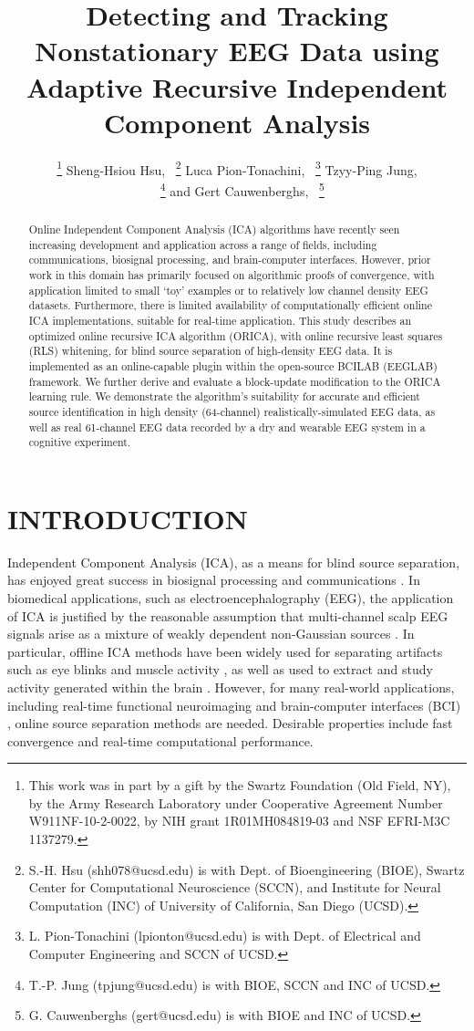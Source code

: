 \documentclass[letterpaper, 10 pt, conference]{ieeeconf}  %
\title{\LARGE \bf
Detecting and Tracking Nonstationary EEG Data using Adaptive Recursive Independent Component Analysis
}
\author{
	\thanks{This work was in part by a gift by the Swartz Foundation (Old Field, NY), by the Army Research Laboratory under Cooperative Agreement Number W911NF-10-2-0022, by NIH grant 1R01MH084819-03 and NSF EFRI-M3C 1137279.}
	Sheng-Hsiou Hsu,~\IEEEmembership{Student Member,~IEEE,}
	\thanks{S.-H. Hsu (shh078@ucsd.edu) is with Dept. of Bioengineering (BIOE), Swartz Center for Computational Neuroscience (SCCN), and Institute for Neural Computation (INC) of University of California, San Diego (UCSD).}
	Luca Pion-Tonachini,~\IEEEmembership{Student Member,~IEEE,}
	\thanks{L. Pion-Tonachini (lpionton@ucsd.edu) is with Dept. of Electrical and Computer Engineering and SCCN of UCSD.}
	Tzyy-Ping Jung,\\~\IEEEmembership{Senior Member,~IEEE,}
	\thanks{T.-P. Jung (tpjung@ucsd.edu) is with BIOE, SCCN and INC of UCSD.}
	and Gert Cauwenberghs,~\IEEEmembership{Fellow,~IEEE}
	\thanks{G. Cauwenberghs (gert@ucsd.edu) is with BIOE and INC of UCSD.}    
}
\begin{document}
\maketitle
\thispagestyle{empty}
\pagestyle{empty}




\begin{abstract}
Online Independent Component Analysis (ICA) algorithms have recently seen increasing development and application across a range of fields, including communications, biosignal processing, and brain-computer interfaces. However, prior work in this domain has primarily focused on algorithmic proofs of convergence, with application limited to small `toy' examples or to relatively low channel density EEG datasets. Furthermore, there is limited availability of computationally efficient online ICA implementations, suitable for real-time application. This study describes an optimized online recursive ICA algorithm (ORICA), with online recursive least squares (RLS) whitening, for blind source separation of high-density EEG data. It is implemented as an online-capable plugin within the open-source BCILAB (EEGLAB) framework. We further derive and evaluate a block-update modification to the ORICA learning rule. 
We demonstrate the algorithm's suitability for accurate and efficient source identification in high density (64-channel) realistically-simulated EEG data, as well as real 61-channel EEG data recorded by a dry and wearable EEG system in a cognitive experiment.

\end{abstract}


\section{INTRODUCTION}
Independent Component Analysis (ICA), as a means for blind source separation, has enjoyed great success in biosignal processing and communications \cite{AapoICABook}.  
In biomedical applications, such as electroencephalography (EEG), the application of ICA is justified by the reasonable assumption that multi-channel scalp EEG signals arise as a mixture of weakly dependent non-Gaussian sources  \cite{delorme2012independent}.
In particular, offline ICA methods have been widely used for separating artifacts such as eye blinks and muscle activity \cite{jung2000removing}, as well as used to extract and study activity generated within the brain \cite{makeig2002dynamic}. However, for many real-world applications, including real-time functional neuroimaging and brain-computer interfaces (BCI) \cite{wang2013improving}, online source separation methods are needed. Desirable properties include fast convergence and real-time computational performance.
\end{document}
